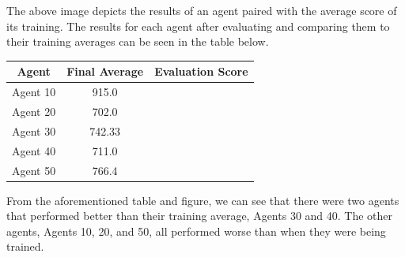 \documentclass[
	a4paper, %
	10pt, %
	unnumberedsections, %
	twoside, %
]{LTJournalArticle}
\begin{document}
The above image depicts the results of an agent paired with the average score of its training. The results for each agent after evaluating and comparing them to their training averages can be seen in the table below.

\begin{center}
	\begin{tabular}{|c|c|c|}
		\hline
		\textbf{Agent} & \textbf{Final Average} & \textbf{Evaluation Score} \\
		\hline
		Agent 10 & 915.0 & \color{red}{140.0} \\ \hline
		Agent 20 & 702.0 & \color{red}{460.0} \\ \hline
		Agent 30 & 742.33 & \color{green}{880.0} \\ \hline
		Agent 40 & 711.0 & \color{green}{830.0} \\ \hline
		Agent 50 & 766.4 & \color{red}{110.0} \\ \hline
	\end{tabular}
\end{center}

From the aforementioned table and figure, we can see that there were two agents that performed better than their training average, Agents 30 and 40. The other agents, Agents 10, 20, and 50, all performed
worse than when they were being trained.
\end{document}
